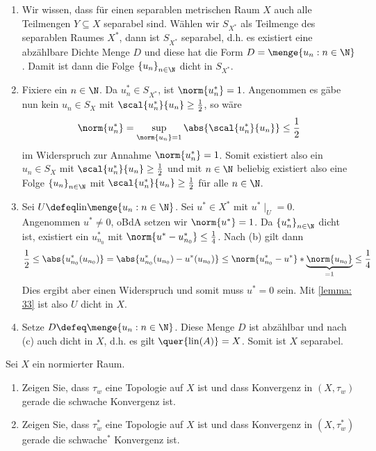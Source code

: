 \begin{exercisePage}
	\begin{enumerate}[label=(zu \alph*), leftmargin=*]
		\item Wir wissen, dass für einen separablen metrischen Raum $X$ auch alle Teilmengen $Y \subseteq X$ separabel sind. Wählen wir $S_{X^\ast}$ als Teilmenge des separablen Raumes $X^\ast$, dann ist $S_{X^\ast}$ separabel, d.h. es existiert eine abzählbare Dichte Menge $D$ und diese hat die Form $D = \menge{u_n : n \in \N}$. Damit ist dann die Folge $\folge{u_n}{n \in \N}$ dicht in $S_{X^\ast}$.
		\item Fixiere ein $n \in \N$. Da $u_n^\ast \in S_{X^\ast}$, ist $\norm{u_n^\ast} = 1$. Angenommen es gäbe nun kein $u_n \in S_X$ mit $\scal{u_n^\ast}{u_n} \ge \frac{1}{2}$, so wäre
		\begin{equation*}
		\norm{u_n^\ast} = \sup_{\norm{u_n} = 1} \abs{\scal{u_n^\ast}{u_n}} \le \frac{1}{2}
		\end{equation*}
		im Widerspruch zur Annahme $\norm{u_n^\ast} = 1$. Somit existiert also ein $u_n \in S_X$ mit $\scal{u_n^\ast}{u_n} \ge \frac{1}{2}$ und mit $n \in \N$ beliebig existiert also eine Folge $\folge{u_n}{n \in \N}$ mit $\scal{u_n^\ast}{u_n} \ge \frac{1}{2}$ für alle $n \in \N$.
		\item Sei $U \defeq \mathrm{lin}\menge{u_n : n \in \N}$. Sei $u^\ast \in X^\ast$ mit $u^\ast \mid_U = 0$. Angenommen $u^\ast \neq 0$, oBdA setzen wir $\norm{u^\ast} = 1$. Da $\folge{u_n^\ast}{n \in \N}$ dicht ist, existiert ein $u_{n_0}^\ast$ mit $\norm{u^\ast - u_{n_0}^\ast} \le \frac{1}{4}$. Nach (b) gilt dann 
		\begin{equation*}
		\frac{1}{2} \le \abs{u_{n_0}^\ast ( u_{n_0} )} = \abs{u_{n_0}^\ast ( u_{n_0} ) - u^\ast(u_{n_0})} \le \norm{u_{n_0}^\ast - u^\ast} * \underbrace{\norm{u_{n_0}}}_{=1} \le \frac{1}{4}
		\end{equation*}
		Dies ergibt aber einen Widerspruch und somit muss $u^\ast = 0$ sein. Mit \cref{lemma: 33} ist also $U$ dicht in $X$.
		\item Setze $D \defeq \menge{u_n : n \in \N}$. Diese Menge $D$ ist abzählbar und nach (c) auch dicht in $X$, d.h. es gilt $\quer{\mathrm{lin}(A)} = X$. Somit ist $X$ separabel.
	\end{enumerate}
	
	\begin{exercise}
		Sei $X$ ein normierter Raum.
		\begin{enumerate}[nolistsep]
			\item Zeigen Sie, dass $\tau_w$ eine Topologie auf $X$ ist und dass Konvergenz in $(X,\tau_w)$ gerade die schwache Konvergenz ist.
			\item Zeigen Sie, dass $\tau_w^\ast$ eine Topologie auf $X$ ist und dass Konvergenz in $(X,\tau_w^\ast)$ gerade die schwache${}^\ast$ Konvergenz ist.
		\end{enumerate}
	\end{exercise}
	

\end{exercisePage}

